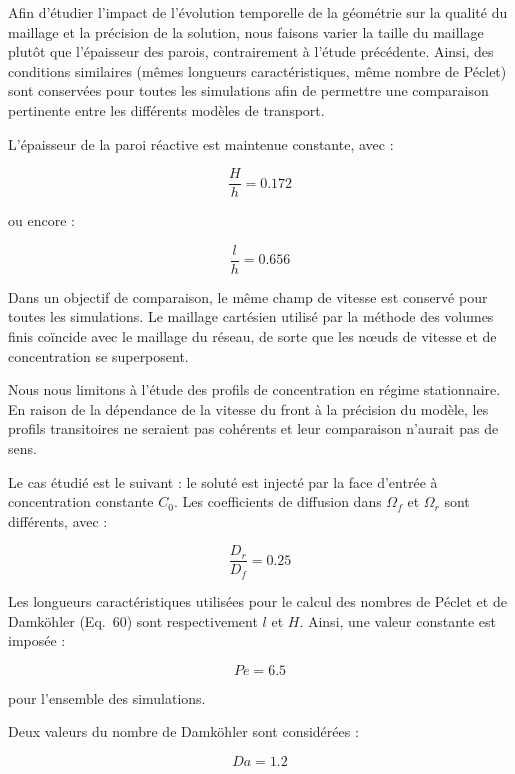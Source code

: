 \documentclass[12pt,a4paper]{report}
\begin{document}
Afin d’étudier l’impact de l’évolution temporelle de la géométrie sur la qualité du maillage et la précision de la solution, nous faisons varier la taille du maillage plutôt que l’épaisseur des parois, contrairement à l’étude précédente. Ainsi, des conditions similaires (mêmes longueurs caractéristiques, même nombre de Péclet) sont conservées pour toutes les simulations afin de permettre une comparaison pertinente entre les différents modèles de transport.

L’épaisseur de la paroi réactive est maintenue constante, avec :

\begin{equation}
\frac{H}{h}=0.172
\end{equation}

ou encore :

\begin{equation}
\frac{l}{h}=0.656
\end{equation}

Dans un objectif de comparaison, le même champ de vitesse est conservé pour toutes les simulations. Le maillage cartésien utilisé par la méthode des volumes finis coïncide avec le maillage du réseau, de sorte que les nœuds de vitesse et de concentration se superposent.

Nous nous limitons à l’étude des profils de concentration en régime stationnaire. En raison de la dépendance de la vitesse du front à la précision du modèle, les profils transitoires ne seraient pas cohérents et leur comparaison n’aurait pas de sens.

Le cas étudié est le suivant : le soluté est injecté par la face d’entrée à concentration constante $C_0$. Les coefficients de diffusion dans $\Omega_f$ et $\Omega_r$ sont différents, avec :

\begin{equation}
\frac{D_r}{D_f}=0.25
\end{equation}

Les longueurs caractéristiques utilisées pour le calcul des nombres de Péclet et de Damköhler (Eq.~60) sont respectivement $l$ et $H$. Ainsi, une valeur constante est imposée :

\begin{equation}
Pe=6.5
\end{equation}

pour l’ensemble des simulations.

Deux valeurs du nombre de Damköhler sont considérées :

\begin{equation}
Da=1.2
\end{equation}
\end{document}
